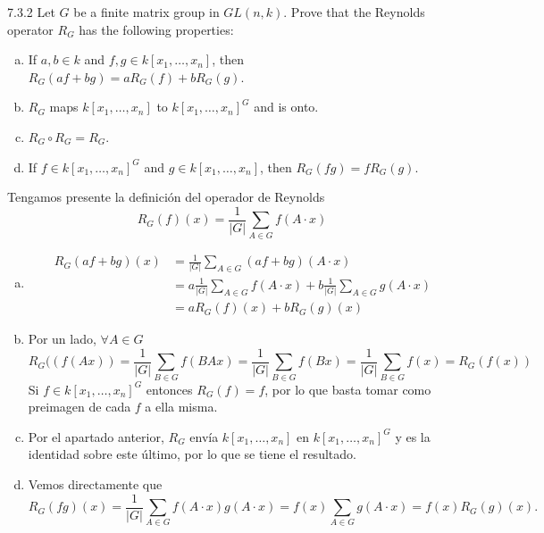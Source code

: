 \documentclass[twoside]{article}
\begin{document}
\begin{ejercicio}{7.3.2}
Let $G$ be a finite matrix group in $GL(n, k)$. Prove that the Reynolds operator $R_G$ has the
following properties:
\begin{enumerate}[a.]
\item If $a, b ∈ k$ and $f , g ∈ k[x_1, \dots, x_n]$, then $R_G(af + bg) = aR_G( f) + bR_G(g)$.
\item $R_G$ maps $k[x_1, \dots, x_n]$ to $k[x_1, \dots , x_n]^G$ and is onto.
\item $R_G \circ R_G = R_G$.
\item If $f ∈ k[x_1, \dots, x_n]^G$ and $g ∈ k[x_1, \dots , x_n]$, then $R_G( fg) = f  R_G(g)$.
\end{enumerate}
\end{ejercicio}
\begin{solucion}
Tengamos presente la definición del operador de Reynolds
\[
R_G( f )(x) =
\frac{1}{|G|}\sum_{A∈G}f (A \cdot x)
\]
\begin{enumerate}[a.]
\item 
\begin{align*}
R_G( af + bg )(x) &= \frac{1}{|G|}\sum_{A∈G}(af + bg) (A \cdot x)\\
&=a\frac{1}{|G|}\sum_{A∈G}f (A \cdot x)+b\frac{1}{|G|}\sum_{A∈G}g (A \cdot x)\\
&=aR_G( f)(x) + bR_G(g)(x)
\end{align*}

\item Por un lado, $\forall A \in G$
$$
R_G((f(Ax)) = \frac{1}{|G|}\sum_{B \in G} f(BAx) = \frac{1}{|G|}\sum_{B \in G} f(Bx) = \frac{1}{|G|}\sum_{B \in G} f(x) = R_G(f(x))
$$
Si $f\in k[x_1,\dotsc,x_n]^G$ entonces $R_G(f)=f$, por lo que basta tomar como preimagen de cada $f$ a ella misma.
\item Por el apartado anterior, $R_G$ envía $k[x_1, \dots, x_n]$ en $k[x_1, \dots, x_n]^G$ y es la identidad sobre este último, por lo que se tiene el resultado.
\item Vemos directamente que 
\[
R_G( fg )(x) =
\frac{1}{|G|}\sum_{A∈G}f (A \cdot x)g(A\cdot x)=f(x)\sum_{A∈G}g(A\cdot x)=f(x)R_G(g)(x).
\]

\end{enumerate}
\end{solucion}

\newpage
\end{document}
